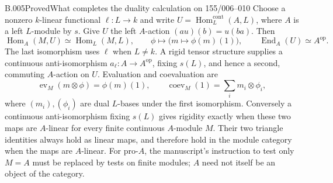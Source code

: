 \begin{saresult}{B.005}{Proved}{What completes the duality calculation on 155/006--010}
Choose a nonzero $k$-linear functional $\ell:L\longrightarrow k$ and
write $U=\operatorname{Hom}^{\mathrm{cont}}_L(A,L)$, where $A$ is a left
$L$-module by $s$. Give $U$ the left $A$-action
$(a u)(b)=u(ba)$. Then
\[
 \operatorname{Hom}_A(M,U)\simeq\operatorname{Hom}_L(M,L),
 \qquad \phi\longmapsto\bigl(m\longmapsto\phi(m)(1)\bigr),
 \qquad \operatorname{End}_A(U)\simeq A^{\mathrm{op}}.
\]
The last isomorphism uses $\ell$ when $L\ne k$. A rigid tensor
structure supplies a continuous anti-isomorphism
$a_\ell:A\longrightarrow A^{\mathrm{op}}$, fixing $s(L)$, and hence a
second, commuting $A$-action on $U$. Evaluation and coevaluation are
\[
 \operatorname{ev}_M(m\otimes\phi)=\phi(m)(1),\qquad
 \operatorname{coev}_M(1)=\sum_i m_i\otimes\phi_i,
\]
where $(m_i), (\phi_i)$ are dual $L$-bases under the first isomorphism.
Conversely a continuous anti-isomorphism fixing $s(L)$ gives rigidity
exactly when these two maps are $A$-linear for every finite continuous
$A$-module $M$. Their two triangle identities always hold as linear
maps, and therefore hold in the module category when the maps are
$A$-linear. For pro-$A$, the manuscript's instruction to test only
$M=A$ must be replaced by tests on finite modules; $A$ need not itself
be an object of the category.
\end{saresult}
